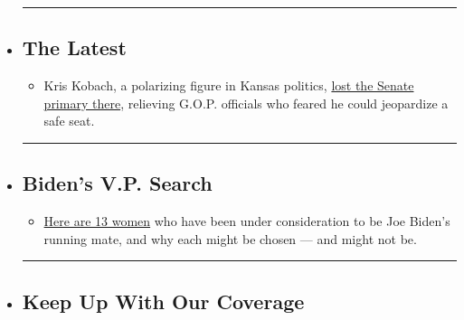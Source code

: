 \begin{itemize}
\item
  \begin{center}\rule{0.5\linewidth}{\linethickness}\end{center}

  \hypertarget{the-latest}{%
  \subsection{The Latest}\label{the-latest}}

  \begin{itemize}
  \tightlist
  \item
    Kris Kobach, a polarizing figure in Kansas politics,
    \href{https://www.nytimes3xbfgragh.onion/2020/08/04/us/politics/kobach-tlaib.html?action=click\&pgtype=Article\&state=default\&region=BELOW_MAIN_CONTENT\&context=storylines_guide}{lost
    the Senate primary there}, relieving G.O.P. officials who feared he
    could jeopardize a safe seat.
  \end{itemize}
\item
  \begin{center}\rule{0.5\linewidth}{\linethickness}\end{center}

  \hypertarget{bidens-vp-search}{%
  \subsection{Biden's V.P. Search}\label{bidens-vp-search}}

  \begin{itemize}
  \tightlist
  \item
    \href{https://www.nytimes3xbfgragh.onion/article/biden-vice-president-2020.html?action=click\&pgtype=Article\&state=default\&region=BELOW_MAIN_CONTENT\&context=storylines_guide}{Here
    are 13 women} who have been under consideration to be Joe Biden's
    running mate, and why each might be chosen --- and might not be.
  \end{itemize}
\item
  \begin{center}\rule{0.5\linewidth}{\linethickness}\end{center}

  \hypertarget{keep-up-with-our-coverage}{%
  \subsection{Keep Up With Our
  Coverage}\label{keep-up-with-our-coverage}}


\end{itemize}
